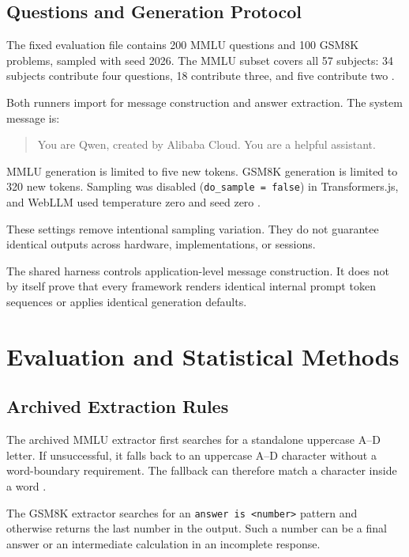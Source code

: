\documentclass[conference]{IEEEtran}
\begin{document}
\subsection{Questions and Generation Protocol}

The fixed evaluation file contains 200 MMLU questions and
100 GSM8K problems, sampled with seed 2026. The MMLU subset
covers all 57 subjects: 34 subjects contribute four
questions, 18 contribute three, and five contribute two
\cite{repository}.

Both runners import  for message
construction and answer extraction. The system message is:

\begin{quote}
\small
You are Qwen, created by Alibaba Cloud.
You are a helpful assistant.
\end{quote}

MMLU generation is limited to five new tokens.
GSM8K generation is limited to 320 new tokens.
Sampling was disabled (\texttt{do\_sample = false}) in
Transformers.js, and WebLLM used temperature zero and seed
zero \cite{repository}.

These settings remove intentional sampling variation.
They do not guarantee identical outputs across hardware,
implementations, or sessions.

The shared harness controls application-level message
construction. It does not by itself prove that every
framework renders identical internal prompt token sequences
or applies identical generation defaults.


\section{Evaluation and Statistical Methods}
\label{sec:methods}

\subsection{Archived Extraction Rules}

The archived MMLU extractor first searches for a standalone
uppercase A--D letter. If unsuccessful, it falls back to an
uppercase A--D character without a word-boundary requirement.
The fallback can therefore match a character inside a word
\cite{repository}.

The GSM8K extractor searches for an
\texttt{answer is <number>} pattern and otherwise returns the
last number in the output. Such a number can be a final
answer or an intermediate calculation in an incomplete
response.
\end{document}
